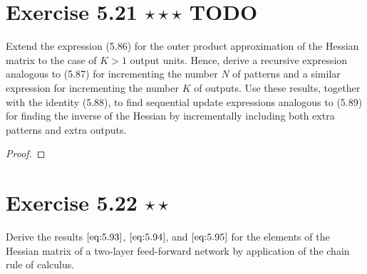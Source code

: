 \section*{Exercise 5.21 $\star \star \star$ TODO}
Extend the expression (5.86) for the outer product approximation
of the Hessian matrix to the case of $K > 1$ output units. Hence,
derive a recursive expression analogous to (5.87) for incrementing
the number $N$ of patterns and a similar expression for incrementing
the number $K$ of outputs. Use these results, together with the identity
(5.88), to find sequential update expressions analogous to (5.89) for
finding the inverse of the Hessian by incrementally including both extra patterns
and extra outputs.
\vspace{1em}

\begin{proof}
    
\end{proof}

\section*{Exercise 5.22 $\star \star$}
Derive the results $\eqref{eq:5.93}$, $\eqref{eq:5.94}$, and $\eqref{eq:5.95}$ for
the elements of the Hessian matrix of a two-layer feed-forward network by application of
the chain rule of calculus.

\vspace{1em}

